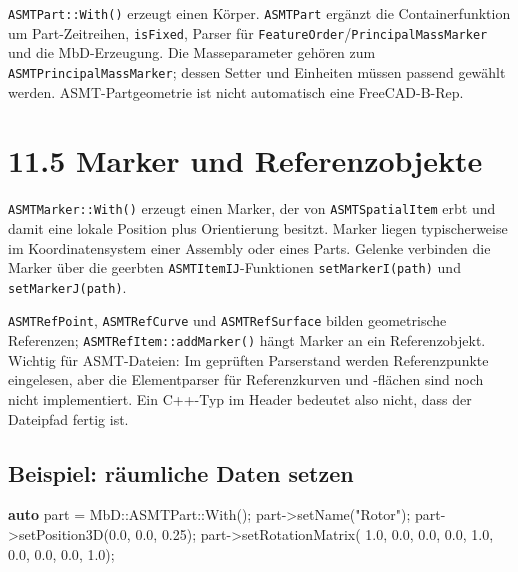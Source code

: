 \documentclass[
  12pt
]{book}
\newenvironment{Shaded}{}{}
\newcommand{\FloatTok}[1]{\textcolor[rgb]{0.25,0.63,0.44}{#1}}
\newcommand{\KeywordTok}[1]{\textcolor[rgb]{0.00,0.44,0.13}{\textbf{#1}}}
\newcommand{\NormalTok}[1]{#1}
\newcommand{\OperatorTok}[1]{\textcolor[rgb]{0.40,0.40,0.40}{#1}}
\newcommand{\StringTok}[1]{\textcolor[rgb]{0.25,0.44,0.63}{#1}}
\begin{document}
\texttt{ASMTPart::With()} erzeugt einen Körper. \texttt{ASMTPart}
ergänzt die Containerfunktion um Part-Zeitreihen, \texttt{isFixed},
Parser für \texttt{FeatureOrder}/\texttt{PrincipalMassMarker} und die
MbD-Erzeugung. Die Masseparameter gehören zum
\texttt{ASMTPrincipalMassMarker}; dessen Setter und Einheiten müssen
passend gewählt werden. ASMT-Partgeometrie ist nicht automatisch eine
FreeCAD-B-Rep.

\hypertarget{marker-und-referenzobjekte}{%
\section{\texorpdfstring{{11.5} Marker und
Referenzobjekte}{11.5 Marker und Referenzobjekte}}\label{marker-und-referenzobjekte}}

\texttt{ASMTMarker::With()} erzeugt einen Marker, der von
\texttt{ASMTSpatialItem} erbt und damit eine lokale Position plus
Orientierung besitzt. Marker liegen typischerweise im Koordinatensystem
einer Assembly oder eines Parts. Gelenke verbinden die Marker über die
geerbten \texttt{ASMTItemIJ}-Funktionen \texttt{setMarkerI(path)} und
\texttt{setMarkerJ(path)}.

\texttt{ASMTRefPoint}, \texttt{ASMTRefCurve} und \texttt{ASMTRefSurface}
bilden geometrische Referenzen; \texttt{ASMTRefItem::addMarker()} hängt
Marker an ein Referenzobjekt. Wichtig für ASMT-Dateien: Im geprüften
Parserstand werden Referenzpunkte eingelesen, aber die Elementparser für
Referenzkurven und -flächen sind noch nicht implementiert. Ein C++-Typ
im Header bedeutet also nicht, dass der Dateipfad fertig ist.

\hypertarget{beispiel-ruxe4umliche-daten-setzen}{%
\subsection*{Beispiel: räumliche Daten
setzen}\label{beispiel-ruxe4umliche-daten-setzen}}

\begin{Shaded}
\begin{Highlighting}[]
\KeywordTok{auto}\NormalTok{ part }\OperatorTok{=}\NormalTok{ MbD}\OperatorTok{::}\NormalTok{ASMTPart}\OperatorTok{::}\NormalTok{With}\OperatorTok{();}
\NormalTok{part}\OperatorTok{{-}\textgreater{}}\NormalTok{setName}\OperatorTok{(}\StringTok{"Rotor"}\OperatorTok{);}
\NormalTok{part}\OperatorTok{{-}\textgreater{}}\NormalTok{setPosition3D}\OperatorTok{(}\FloatTok{0.0}\OperatorTok{,} \FloatTok{0.0}\OperatorTok{,} \FloatTok{0.25}\OperatorTok{);}
\NormalTok{part}\OperatorTok{{-}\textgreater{}}\NormalTok{setRotationMatrix}\OperatorTok{(}
    \FloatTok{1.0}\OperatorTok{,} \FloatTok{0.0}\OperatorTok{,} \FloatTok{0.0}\OperatorTok{,}
    \FloatTok{0.0}\OperatorTok{,} \FloatTok{1.0}\OperatorTok{,} \FloatTok{0.0}\OperatorTok{,}
    \FloatTok{0.0}\OperatorTok{,} \FloatTok{0.0}\OperatorTok{,} \FloatTok{1.0}\OperatorTok{);}
\end{Highlighting}
\end{Shaded}
\end{document}
